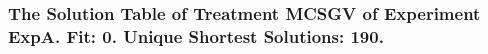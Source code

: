  \begin{frame}
 \fontsize{8pt}{9pt}\selectfont
 \frametitle{ The Solution Table of Treatment MCSGV of Experiment ExpA. Fit: 0. Unique Shortest Solutions: 190. }

 \label{ExpASolutionTable002.tex}  
 \end{frame}

